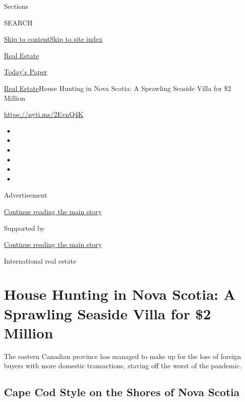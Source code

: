 Sections

SEARCH

\protect\hyperlink{site-content}{Skip to
content}\protect\hyperlink{site-index}{Skip to site index}

\href{https://www.nytimes3xbfgragh.onion/section/realestate}{Real
Estate}

\href{https://myaccount.nytimes3xbfgragh.onion/auth/login?response_type=cookie\&client_id=vi}{}

\href{https://www.nytimes3xbfgragh.onion/section/todayspaper}{Today's
Paper}

\href{/section/realestate}{Real Estate}\textbar{}House Hunting in Nova
Scotia: A Sprawling Seaside Villa for \$2 Million

\url{https://nyti.ms/2EvnQ4K}

\begin{itemize}
\item
\item
\item
\item
\item
\item
\end{itemize}

Advertisement

\protect\hyperlink{after-top}{Continue reading the main story}

Supported by

\protect\hyperlink{after-sponsor}{Continue reading the main story}

International real estate

\hypertarget{house-hunting-in-nova-scotia-a-sprawling-seaside-villa-for-2-million}{%
\section{House Hunting in Nova Scotia: A Sprawling Seaside Villa for \$2
Million}\label{house-hunting-in-nova-scotia-a-sprawling-seaside-villa-for-2-million}}

The eastern Canadian province has managed to make up for the loss of
foreign buyers with more domestic transactions, staving off the worst of
the pandemic.

\href{https://www.nytimes3xbfgragh.onion/slideshow/2020/07/29/realestate/cape-cod-style-on-the-shores-of-nova-scotia.html}{}

\hypertarget{cape-cod-style-on-the-shores-of-nova-scotia}{%
\subsection{Cape Cod Style on the Shores of Nova
Scotia}\label{cape-cod-style-on-the-shores-of-nova-scotia}}

